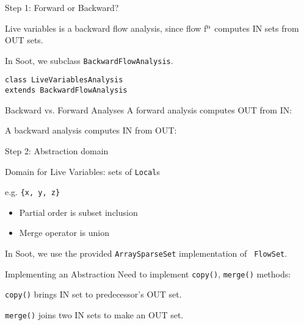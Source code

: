 \begin{slide}{Step 1: Forward or Backward?}

Live variables is a backward flow analysis, since flow
f$^{\mbox{\scriptsize n}}$ computes {\sf IN} sets from {\sf OUT} sets.

\qquad

In Soot, we subclass {\tt \red BackwardFlowAnalysis}.

\qquad

{\red \tt class LiveVariablesAnalysis \\ \qquad extends BackwardFlowAnalysis}
\end{slide}

\begin{slide}{Backward vs. Forward Analyses}
\vspace*{-0.24in}
A forward analysis computes {\sf OUT} from {\sf IN}:

\vspace*{-0.05in}
\begin{center}

\end{center}

\vspace*{-0.05in}
A backward analysis computes {\sf IN} from {\sf OUT}:

\begin{center}

\end{center}

\end{slide}

\begin{slide}{Step 2: Abstraction domain}
\vspace*{-0.2in}

Domain for Live Variables: sets of {\tt Local}s

\qquad e.g. {\tt  \{x, y, z\}}

\begin{itemize}

\item Partial order is subset inclusion

\item Merge operator is union 

\end{itemize} 

In Soot, we use the provided {\tt ArraySparseSet} implementation of {\tt
FlowSet}.
\end{slide}

\begin{slide}{Implementing an Abstraction}
\vspace*{-0.2in}
Need to implement {\tt copy()}, {\tt merge()} methods:
\begin{center}

\end{center}
{\tt copy()} brings IN set to predecessor's OUT set.

\begin{center}

\end{center}
{\tt merge()} joins two IN sets to make an OUT set.
\end{slide}

